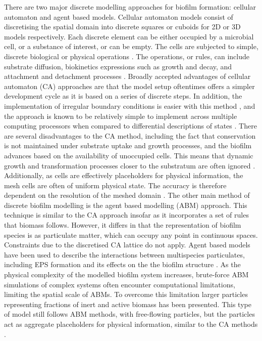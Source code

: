 There are two major discrete modelling approaches for biofilm formation: cellular automaton and agent based models. Cellular automaton models consist of discretising the spatial domain into discrete squares or cuboids for 2D or 3D models respectively. Each discrete element can be either occupied by a microbial cell, or a substance of interest, or can be empty. The cells are subjected to simple, discrete biological or physical operations \cite{Mattei2015}. The operations, or rules, can include substrate diffusion, biokinetics expressions such as growth and decay, and attachment and detachment processes \cite{skoneczny2015}. Broadly accepted advantages of cellular automaton (CA) approaches are that the model setup oftentimes offers a simpler  development cycle as it is based on a series of discrete steps. In addition, the implementation of irregular boundary conditions is easier with this method \cite{pizzaro2001}, and the approach is known to be relatively simple to implement across multiple computing processors when compared to differential descriptions of states \cite{toffoli1987} . There are several disadvantages to the CA method, including the fact that conservation is not maintained under substrate uptake and growth processes, and the biofilm advances based on the availability of unoccupied cells. This means that dynamic growth and transformation processes closer to the substratum are often ignored \cite{Mattei2015}. Additionally, as cells are effectively placeholders for physical information, the mesh cells are often of uniform physical state. The accuracy is therefore dependent on the resolution of the meshed domain \cite{Mattei2015}.
\skippingparagraph
The other main method of discrete biofilm modelling is the agent based modelling (ABM) approach. This technique is similar to the CA approach insofar as it incorporates a set of rules that biomass follows. However, it differs in that the representation of biofilm species is as particulate matter, which can occupy any point in continuous spaces. Constraints due to the discretised CA lattice do not apply. Agent based models have been used to describe the interactions between multispecies particulates, including EPS formation and its effects on the the biofilm structure \cite{xavier2005a}. As the physical complexity of the modelled biofilm system increases, brute-force ABM simulations of complex systems often encounter computational limitations, limiting the spatial scale of ABMs. To overcome this limitation larger particles representing fractions of inert and active biomass has been presented. This type of model still follows ABM methods, with free-flowing particles, but the particles act as aggregate placeholders for physical information, similar to the CA methods \cite{picioreanu2004}.
